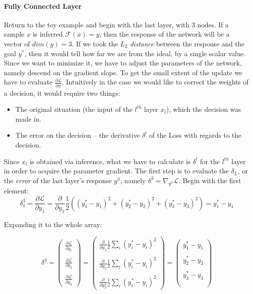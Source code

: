 \paragraph{Fully Connected Layer}
Return to the toy example and begin with the last layer, with $3$ nodes. If a sample $x$ is inferred $\mathcal{F}(x)=y$, then the response of the network will be a vector of $dim(y) = 3$. If we took the $L_2$ \emph{distance} between the response and the goal $y^*$, then it would tell how far we are from the ideal, by a single scalar value. Since we want to minimize it, we have to adjust the parameters of the network, namely descend on the gradient slope. To get the small extent of the update we have to evaluate $\frac{\partial\mathcal{L}}{\partial \phi}$. 
Intuitively in the case we would like to correct the weights of a decision, it would require two things:
\begin{itemize}
    \item[] The original situation (the input of the $l^{th}$ layer $x_l$), which the decision was made in.
    \item[] The error on the decision -- the derivative $\delta^l$ of the Loss with regards to the decision.
\end{itemize}
Since $x_l$ is obtained via inference, what we have to calculate is $\delta^l$ for the $l^{th}$ layer in order to acquire the parameter gradient.
The first step is to evaluate the $\delta_L$, or the \emph{error} of the last layer's response $y^3$, namely $\delta^3 = \nabla_{y^3} \mathcal{L}$.
Begin with the first element: 
$$
    \delta_1^3 = 
    \frac{\partial \mathcal{L}}{\partial y_1} = 
    \frac{\partial}{\partial y_1}\frac{1}{2}\left((y^*_1 - y_1)^2 + (y^*_2 - y_2)^2 + (y^*_3 - y_3)^2\right) = y^*_1 - y_1
$$
\begin{center}
Expanding it to the whole array:
\end{center}
$$
    \delta^3 = \begin{pmatrix}
     \frac{\partial \mathcal{L}}{\partial y_1}\\ \\
    \frac{\partial \mathcal{L}}{\partial y_2} \\ \\
    \frac{\partial \mathcal{L}}{\partial y_3}
    \end{pmatrix} = \begin{pmatrix}
     \frac{\partial}{\partial y_1} \frac{1}{2}\sum_i(y_i^*-y_i)^2\\ \\
    \frac{\partial}{\partial y_2} \frac{1}{2}\sum_i(y_i^*-y_i)^2 \\ \\
    \frac{\partial}{\partial y^3_3}  \frac{1}{2}\sum_i(y_i^*-y_i)^2
    \end{pmatrix} = \begin{pmatrix}
     {y^*_1-y_1}\\ \\
     {y^*_2-y_2}\\ \\
     {y^*_3-y_3}\\ \\
    \end{pmatrix} 
$$
